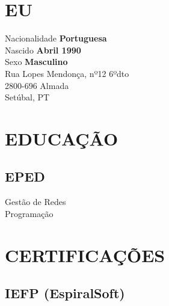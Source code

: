 \documentclass[letterpaper]{deedy-resume} %
\begin{document}

\lastupdated %



\begin{minipage}[t]{0.33\textwidth}

\section{EU}

Nacionalidade \textbf{Portuguesa}\\
Nascido \textbf{Abril 1990}\\
Sexo \textbf{Masculino}\\

Rua Lopes Mendonça, nº12 6ºdto\\
2800-696 Almada\\
Setúbal, PT\\

\sectionspace

\section{EDUCAÇÃO}
\subsection{EPED}
Gestão de Redes\\
Programação

\sectionspace

\section{CERTIFICAÇÕES}
\subsection{IEFP (EspiralSoft)}

\end{minipage}
\end{document}
